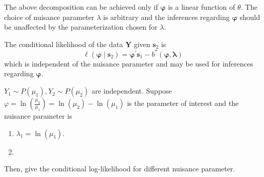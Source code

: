 \begin{remark}
    The above decomposition can be achieved only if $\boldsymbol{\varphi}$ is a linear function of $\theta$. The choice of nuisance parameter $\lambda$ is arbitrary and the inferences regarding $\boldsymbol{\varphi}$ should be unaffected by the parameterization chosen for $\lambda$.
\end{remark}

The conditional likelihood of the data $\mathbf{Y}$ given $\mathbf{s}_{2}$ is
\begin{equation}
    \ell\left(\boldsymbol{\varphi}\mid\mathbf{s}_{2}\right)=\boldsymbol{\varphi}^{\prime}\mathbf{s}_{1}-b^{*}\left(\boldsymbol{\varphi},\boldsymbol{\lambda}\right)
\end{equation}
which is independent of the nuisance parameter and may be used for inferences regarding $\boldsymbol{\varphi}$.

\begin{example}
    $Y_{1}\sim P\left(\mu_{1}\right),Y_{2}\sim P\left(\mu_{2}\right)$ are independent. Suppose $\varphi=\ln\left(\frac{\mu_{2}}{\mu_{1}}\right)=\ln\left(\mu_{2}\right)-\ln\left(\mu_{1}\right)$ is the parameter of interest and the nuisance parameter is
    \begin{enumerate}
        \item $\lambda_{1}=\ln\left(\mu_{1}\right)$.
        \item
    \end{enumerate}
    Then, give the conditional log-likelihood for different nuisance parameter.
\end{example}

